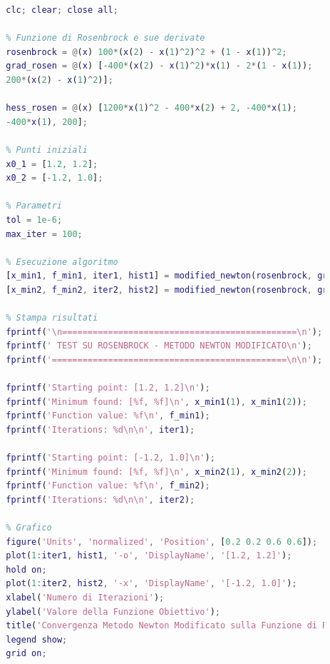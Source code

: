 \documentclass[a4paper,12pt]{article}
\begin{document}
\begin{lstlisting}[language=Matlab,caption={Modified Newton Method with Armijo Backtracking Line Search},label={lst:modified-newton}]
		% Test del Metodo di Newton modificato sulla funzione di Rosenbrock
		clc; clear; close all;
		
		% Funzione di Rosenbrock e sue derivate
		rosenbrock = @(x) 100*(x(2) - x(1)^2)^2 + (1 - x(1))^2;
		grad_rosen = @(x) [-400*(x(2) - x(1)^2)*x(1) - 2*(1 - x(1));
		200*(x(2) - x(1)^2)];
		
		hess_rosen = @(x) [1200*x(1)^2 - 400*x(2) + 2, -400*x(1);
		-400*x(1), 200];
		
		% Punti iniziali
		x0_1 = [1.2, 1.2];
		x0_2 = [-1.2, 1.0];
		
		% Parametri
		tol = 1e-6;
		max_iter = 100;
		
		% Esecuzione algoritmo
		[x_min1, f_min1, iter1, hist1] = modified_newton(rosenbrock, grad_rosen, hess_rosen, x0_1, tol, max_iter,"rn");
		[x_min2, f_min2, iter2, hist2] = modified_newton(rosenbrock, grad_rosen, hess_rosen, x0_2, tol, max_iter,"rn");
		
		% Stampa risultati
		fprintf('\n==============================================\n');
		fprintf(' TEST SU ROSENBROCK - METODO NEWTON MODIFICATO\n');
		fprintf('==============================================\n\n');
		
		fprintf('Starting point: [1.2, 1.2]\n');
		fprintf('Minimum found: [%f, %f]\n', x_min1(1), x_min1(2));
		fprintf('Function value: %f\n', f_min1);
		fprintf('Iterations: %d\n\n', iter1);
		
		fprintf('Starting point: [-1.2, 1.0]\n');
		fprintf('Minimum found: [%f, %f]\n', x_min2(1), x_min2(2));
		fprintf('Function value: %f\n', f_min2);
		fprintf('Iterations: %d\n\n', iter2);
		
		% Grafico
		figure('Units', 'normalized', 'Position', [0.2 0.2 0.6 0.6]);  % finestra grande
		plot(1:iter1, hist1, '-o', 'DisplayName', '[1.2, 1.2]');
		hold on;
		plot(1:iter2, hist2, '-x', 'DisplayName', '[-1.2, 1.0]');
		xlabel('Numero di Iterazioni');
		ylabel('Valore della Funzione Obiettivo');
		title('Convergenza Metodo Newton Modificato sulla Funzione di Rosenbrock');
		legend show;
		grid on;
	\end{lstlisting}
\newpage
\end{document}
